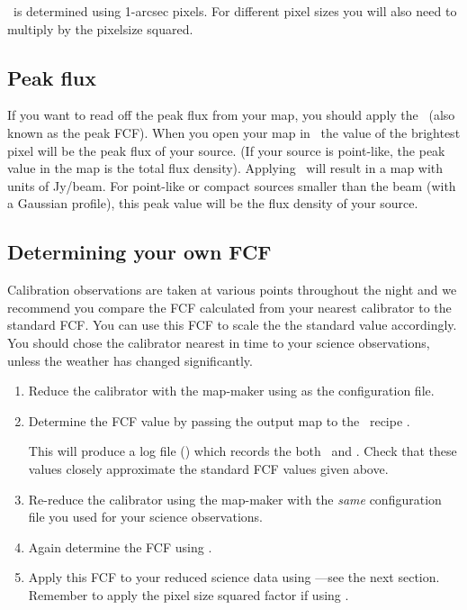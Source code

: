 \documentclass[11pt,oneside,chapters]{starlink}
\begin{document}
\fcfa\ is determined using 1-arcsec pixels. For different pixel sizes
you will also need to multiply by the pixelsize squared.

\subsection{Peak flux}

If you want to read off the peak flux from your map, you should apply
the \fcfb\ (also known as the peak FCF).  When you open your map in
\gaia\ the value of the brightest pixel will be the peak flux of your
source. (If your source is point-like, the peak value in the map is
the total flux density). Applying \fcfb\ will result in a map with
units of Jy/beam. For point-like or compact sources smaller than the
beam (with a Gaussian profile), this peak value will be the flux
density of your source.

\subsection{Determining your own FCF}

Calibration observations are taken at various points throughout the
night and we recommend you compare the FCF calculated from your
nearest calibrator to the standard FCF. You can use this FCF to scale
the the standard value accordingly. You should chose the calibrator
nearest in time to your science observations, unless the weather has
changed significantly.

\begin{enumerate}
\item
Reduce the calibrator with the map-maker using
 as the configuration file.

\item
Determine the FCF value by passing the output map to the
\picard\ recipe .
\begin{terminalv}
\end{terminalv}
This will produce a log file () which records the both
\fcfb\ and \fcfa. Check that these values closely approximate the
standard FCF values given above.

\item
Re-reduce the calibrator using the map-maker with the \emph{same}
configuration file you used for your science observations.

\item
Again determine the FCF using .

\item
Apply this FCF to your reduced science data using \cmult---see the next
section. Remember to apply the pixel size squared factor if using
\fcfa.
\end{enumerate}
\end{document}
